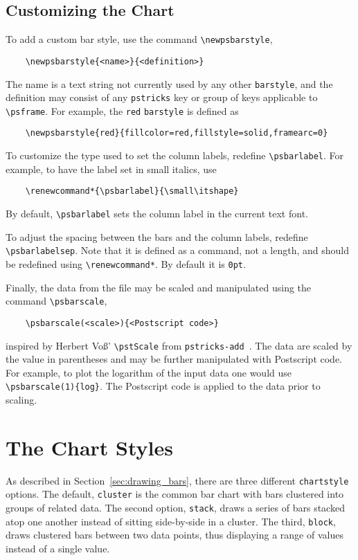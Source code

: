 \documentclass[11pt,english,BCOR10mm,DIV12,bibliography=totoc,parskip=false,smallheadings
    headexclude,footexclude,oneside]{pst-doc}
\begin{document}
    \subsection{Customizing the Chart}
      \label{sec:customizing}%
      To add a custom bar style, use the command \verb|\newpsbarstyle|,
      \begin{verbatim}
    \newpsbarstyle{<name>}{<definition>}\end{verbatim}
      The name is a text string not currently used by any other
      \verb|barstyle|, and the definition may consist of any \verb|pstricks|
      key or group of keys applicable to \verb|\psframe|. For example, the
      \verb|red| \verb|barstyle| is defined as
      \begin{verbatim}
    \newpsbarstyle{red}{fillcolor=red,fillstyle=solid,framearc=0}\end{verbatim}

      To customize the type used to set the column labels, redefine
      \verb|\psbarlabel|. For example, to have the label set in small italics,
      use
      \begin{verbatim}
    \renewcommand*{\psbarlabel}{\small\itshape}\end{verbatim}
      By default, \verb|\psbarlabel| sets the column label in the current text
      font.

      To adjust the spacing between the bars and the column labels, redefine
      \verb|\psbarlabelsep|. Note that it is defined as a command, not a
      length, and should be redefined using \verb|\renewcommand*|. By default
      it is \verb|0pt|.

      Finally, the data from the file may be scaled and manipulated using the
      command \verb|\psbarscale|,
      \begin{verbatim}
    \psbarscale(<scale>){<Postscript code>}\end{verbatim}
      inspired by Herbert Vo\ss' \verb|\pstScale| from
      \verb|pstricks-add|~\cite{voss:04}. The data are scaled by the value in
      parentheses and may be further manipulated with Postscript code. For
      example, to plot the logarithm of the input data one would use
      \verb|\psbarscale(1){log}|. The Postscript code is applied to the data
      prior to scaling.

  \section{The Chart Styles}
    As described in Section~\ref{sec:drawing_bars}, there are three different
    \verb|chartstyle| options. The default, \verb|cluster| is the common bar
    chart with bars clustered into groups of related data. The second option,
    \verb|stack|, draws a series of bars stacked atop one another instead of
    sitting side-by-side in a cluster. The third, \verb|block|, draws clustered
    bars between two data points, thus displaying a range of values instead of
    a single value.
\end{document}
